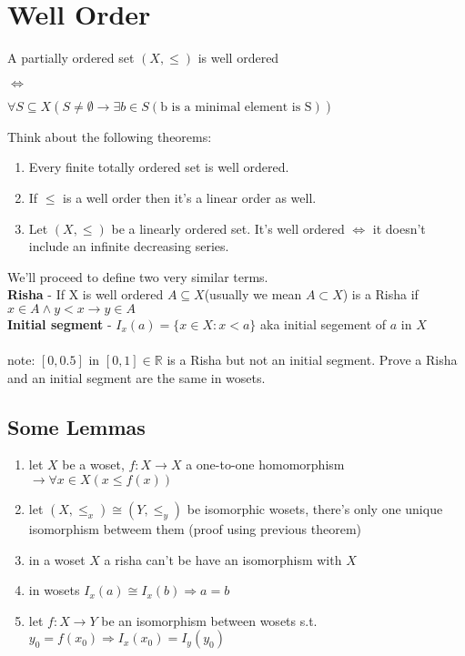 \documentclass{article}
\newcommand{\R}{\mathbb{R}}
\begin{document}
\section{Well Order}
	A partially ordered set $(X,\le)$ is well ordered
	\begin{center}$\iff$ \end{center}
	\begin{center}$\forall S\subseteq X(S\neq\emptyset\rightarrow \exists b\in S(\text{b is a minimal element is S}))$\end{center}
	Think about the following theorems:
	\begin{enumerate}
	\item Every finite totally ordered set is well ordered.
	\item If $\le$ is a well order then it's a linear order as well.
	\item Let  $(X,\le)$ be a linearly ordered set. It's well ordered $\iff$ it doesn't include an infinite decreasing series.
	\end{enumerate}
	We'll proceed to define two very similar terms.\\
	\textbf{Risha }- If X is well ordered $A\subseteq X$(usually we mean $A\subset X$) is a Risha if $x\in A\land y<x \rightarrow y\in A$\\
	\textbf{Initial segment} - $I_x(a) = \{x\in X:x<a\}$ aka initial segement of $a$ in $X$\\
	\\note: $[0,0.5]$ in $[0,1]\in\R$ is a Risha but not an initial segment. Prove a Risha and an initial segment are the same in wosets.
	
	
	\subsection{Some Lemmas}
	\begin{enumerate}
	\item let $X$ be a woset, $f:X\rightarrow X$ a one-to-one homomorphism $\rightarrow \forall x\in X(x\le f(x))$
	\item let $(X,\le_x)\cong(Y,\le_y)$ be isomorphic wosets, there's only one unique isomorphism betweem them (proof using previous theorem)
	\item in a woset $X$ a risha can't be have an isomorphism with $X$
	\item in wosets $I_x(a)\cong I_x(b) \Rightarrow a=b$
	\item let $f:X\rightarrow Y$ be an isomorphism between wosets s.t. $y_0=f(x_0) \Rightarrow I_x(x_0)=I_y(y_0)$
	\end{enumerate}
\end{document}
